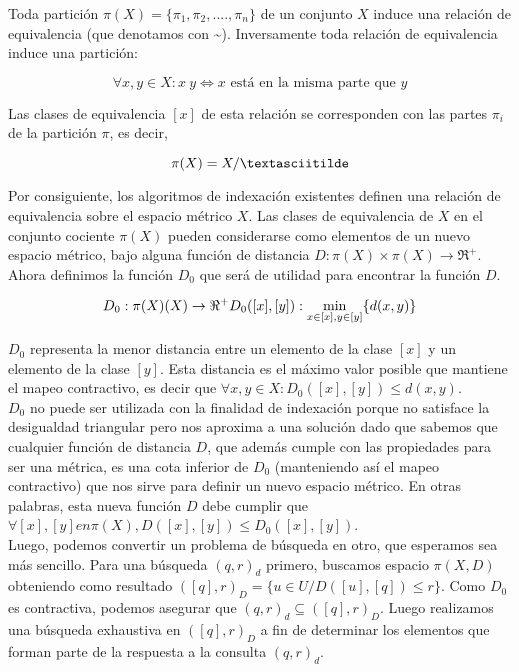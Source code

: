 Toda partici\'on $\pi(X) = \{\pi_1, \pi_2,...., \pi_n\}$ de un conjunto $X$ induce una relaci\'on de equivalencia (que denotamos con \textasciitilde ). Inversamente toda relaci\'on de equivalencia induce una partici\'on:

 \[
\forall x,y  \in X: x ~ y  \Leftrightarrow x \mbox{ est\'a en la misma parte que } y
\]


Las clases de equivalencia $[x]$ de esta relaci\'on se corresponden con las partes $\pi_i$ de la partici\'on $\pi$, es decir,

\[
\pi(X) = X/\textasciitilde
\]


Por consiguiente, los algoritmos de indexaci\'on existentes definen una relaci\'on de equivalencia sobre el espacio m\'etrico $X$. Las clases de equivalencia de $X$ en el conjunto cociente $\pi(X)$ pueden considerarse como elementos de un nuevo espacio m\'etrico, bajo alguna funci\'on de distancia $D: \pi(X)  \times \pi(X) \rightarrow  \Re^+$.\\

Ahora definimos la funci\'on $D_0$ que ser\'a de utilidad para encontrar la funci\'on $D$.

\[
D_0: 	\pi(X) \time \pi(X)  \rightarrow \Re^+
D_0([x],[y]): \min_{x \in [x], y \in [y]}\{d(x,y)\}
\]
			
$D_0$ representa la menor distancia entre un elemento de la clase $[x]$ y un elemento de la clase $[y]$. Esta distancia es el m\'aximo valor posible que mantiene el mapeo contractivo, es decir que $\forall x,y \in X : D_0([x],[y]) \leq d(x,y)$.\\
					
$D_0$ no puede ser utilizada con la finalidad de indexaci\'on porque no satisface la desigualdad triangular pero nos aproxima a una soluci\'on dado que sabemos que cualquier funci\'on de distancia $D$, que adem\'as cumple con las propiedades para ser una m\'etrica, es una cota inferior de $D_0$ (manteniendo as\'i el mapeo contractivo) que nos sirve para definir un nuevo espacio m\'etrico. En otras palabras, esta nueva funci\'on $D$ debe cumplir que $\forall [x],[y] en \pi(X),  D([x],[y]) \leq D_0([x],[y])$.\\

Luego, podemos convertir un problema de b\'usqueda en otro, que esperamos sea m\'as sencillo. Para una b\'usqueda $(q, r)_d$ primero, buscamos espacio $\pi(X, D)$ obteniendo como resultado $([q], r)_D = \{u \in  U/ D([u],[q]) \leq r\}$. Como $D_0$  es contractiva, podemos asegurar que $(q, r)_d \subseteq ([q], r)_D$.  Luego realizamos una b\'usqueda exhaustiva en $([q], r)_D$ a fin de determinar los elementos que forman parte de la respuesta a la consulta $(q, r)_d$.\\
				
